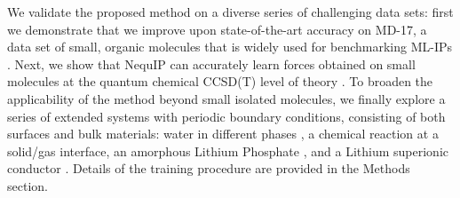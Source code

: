 \documentclass[11pt]{article}
\begin{document}
We validate the proposed method on a diverse series of challenging data sets: first we demonstrate that we improve upon state-of-the-art accuracy on MD-17, a data set of small, organic molecules that is widely used for benchmarking ML-IPs \cite{chmiela2017machine, schutt2017quantum, sgdml, schnet_neurips, klicpera2020directional}. Next, we show that NequIP can accurately learn forces obtained on small molecules at the quantum chemical CCSD(T) level of theory \cite{sgdml}. To broaden the applicability of the method beyond small isolated molecules, we finally explore a series of extended systems with periodic boundary conditions, consisting of both surfaces and bulk materials: water in different phases \cite{deepmd, deepmd_water_paper}, a chemical reaction at a solid/gas interface, an amorphous Lithium Phosphate \cite{dcf}, and a Lithium superionic conductor \cite{gnnff}. Details of the training procedure are provided in the Methods section.
\end{document}

